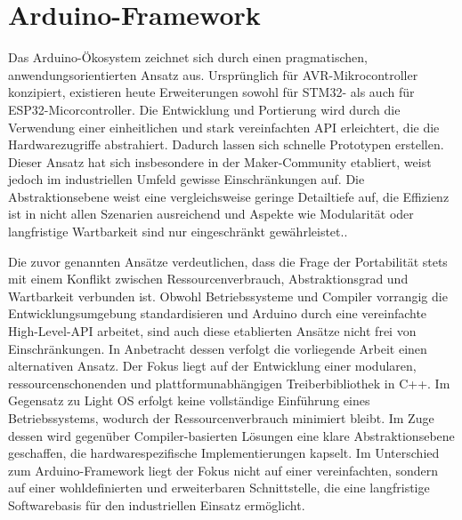 \section{Arduino-Framework}
Das Arduino-Ökosystem zeichnet sich durch einen pragmatischen, anwendungsorientierten Ansatz aus.
Ursprünglich für AVR-Mikrocontroller konzipiert, existieren heute Erweiterungen sowohl für STM32- als auch für ESP32-Micorcontroller. 
Die Entwicklung und Portierung wird durch die Verwendung einer einheitlichen und stark vereinfachten API erleichtert, die die Hardwarezugriffe abstrahiert. 
Dadurch lassen sich schnelle Prototypen erstellen. 
Dieser Ansatz hat sich insbesondere in der Maker-Community etabliert, weist jedoch im industriellen Umfeld gewisse Einschränkungen auf. 
Die Abstraktionsebene weist eine vergleichsweise geringe Detailtiefe auf, die Effizienz ist in nicht allen Szenarien ausreichend und Aspekte wie Modularität oder langfristige Wartbarkeit sind nur eingeschränkt gewährleistet.\cite{stm32duino}\cite{arduinoesp32}. 

\vspace{0.5cm}
\vspace{0.5cm}

Die zuvor genannten Ansätze verdeutlichen, dass die Frage der Portabilität stets mit einem Konflikt zwischen Ressourcenverbrauch, Abstraktionsgrad und Wartbarkeit verbunden ist. 
Obwohl Betriebssysteme und Compiler vorrangig die Entwicklungsumgebung standardisieren und Arduino durch eine vereinfachte High-Level-API arbeitet, sind auch diese etablierten Ansätze nicht frei von Einschränkungen. 
In Anbetracht dessen verfolgt die vorliegende Arbeit einen alternativen Ansatz. 
Der Fokus liegt auf der Entwicklung einer modularen, ressourcenschonenden und plattformunabhängigen Treiberbibliothek in C++. 
Im Gegensatz zu Light OS erfolgt keine vollständige Einführung eines Betriebssystems, wodurch der Ressourcenverbrauch minimiert bleibt. 
Im Zuge dessen wird gegenüber Compiler-basierten Lösungen eine klare Abstraktionsebene geschaffen, die hardwarespezifische Implementierungen kapselt.
Im Unterschied zum Arduino-Framework liegt der Fokus nicht auf einer vereinfachten, sondern auf einer wohldefinierten und erweiterbaren Schnittstelle, die eine langfristige Softwarebasis für den industriellen Einsatz ermöglicht.